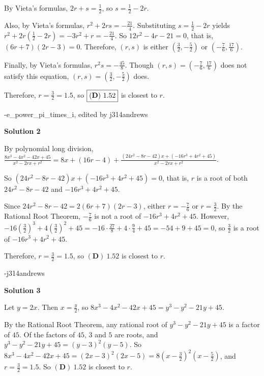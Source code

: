 \begin{enumerate}
 By Vieta's formulas, $2r+s = \frac{1}{2}$, so $s = \frac{1}{2} - 2r$.  

 Also, by Vieta's formulas, $r^2 + 2rs = -\frac{21}{4}$.  Substituting $s = \frac{1}{2} - 2r$ yields $r^2 + 2r\left(\frac{1}{2} - 2r\right) = -3r^2 + r = -\frac{21}{4}$.  So $12r^2 - 4r - 21 = 0$, that is, $(6r + 7)(2r - 3) = 0$.  Therefore, $(r, s)$ is either $\left(\frac{3}{2}, -\frac{5}{2}\right)$ or $\left(-\frac{7}{6}, \frac{17}{6}\right)$. 

 Finally, by Vieta's formulas, $r^2s = -\frac{45}{8}$.  Though $(r, s) = \left(-\frac{7}{6}, \frac{17}{6}\right)$ does not satisfy this equation, $\left(r, s\right) = \left(\frac{3}{2}, -\frac{5}{2}\right)$ does.  

 Therefore, $r = \frac{3}{2} = 1.5$, so $\boxed{\text{(\textbf{D})} \ 1.52}$ is closest to $r$.

 -e\_power\_pi\_times\_i, edited by j314andrews

 



\textbf{Solution 2}

By polynomial long division, $\frac{8x^3 - 4x^2 - 42x + 45}{x^2 - 2rx + r^2} = 8x + (16r-4) + \frac{(24r^2 - 8r - 42)x + (-16r^3 + 4r^2 + 45)}{x^2 - 2rx + r^2}$.

 So $(24r^2 - 8r - 42)x + (-16r^3 + 4r^2 + 45) = 0$, that is, $r$ is a root of both $24r^2 - 8r - 42$ and $-16r^3 + 4r^2 + 45$. 

 Since $24r^2 - 8r - 42 = 2(6r + 7)(2r - 3)$, either $r = -\frac{7}{6}$ or $r = \frac{3}{2}$.  By the Rational Root Theorem, $-\frac{7}{6}$ is not a root of $-16r^3 + 4r^2 + 45$.  However, $-16\left(\frac{3}{2}\right)^3 + 4\left(\frac{3}{2}\right)^2 + 45 = -16 \cdot \frac{27}{8} + 4 \cdot \frac{9}{4} + 45 = -54 + 9 + 45 = 0$, so $\frac{3}{2}$ is a root of $-16r^3 + 4r^2 + 45$.

 Therefore, $r = \frac{3}{2} = 1.5$, so $\boxed{(\textbf{D})\ 1.52}$ is closest to $r$.

 -j314andrews

 



\textbf{Solution 3}

Let $y = 2x$.  Then $x = \frac{y}{2}$, so $8x^3 - 4x^2 - 42x + 45 = y^3 - y^2 - 21y + 45$.

 By the Rational Root Theorem, any rational root of $y^3 - y^2 - 21y + 45$ is a factor of $45$.  Of the factors of $45$, $3$ and $5$ are roots, and $y^3 - y^2 - 21y + 45 = (y-3)^2(y-5)$.  So $8x^3 - 4x^2 - 42x + 45 = (2x-3)^2(2x-5) = 8\left(x-\frac{3}{2}\right)^2\left(x-\frac{5}{2}\right)$, and $r = \frac{3}{2} = 1.5$. So $\boxed{(\textbf{D})\ 1.52}$ is closest to $r$.


\end{enumerate}
